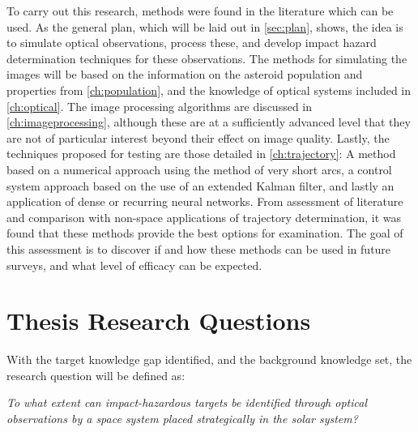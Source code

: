 To carry out this research, methods were found in the literature which can be used. As the general plan, which will be laid out in \autoref{sec:plan}, shows, the idea is to simulate optical observations, process these, and develop impact hazard determination techniques for these observations. The methods for simulating the images will be based on the information on the asteroid population and properties from \autoref{ch:population}, and the knowledge of optical systems included in \autoref{ch:optical}. The image processing algorithms are discussed in \autoref{ch:imageprocessing}, although these are at a sufficiently advanced level that they are not of particular interest beyond their effect on image quality. Lastly, the techniques proposed for testing are those detailed in \autoref{ch:trajectory}: A method based on a numerical approach using the method of very short arcs, a control system approach based on the use of an extended Kalman filter, and lastly an application of dense or recurring neural networks. From assessment of literature and comparison with non-space applications of trajectory determination, it was found that these methods provide the best options for examination. The goal of this assessment is to discover if and how these methods can be used in future surveys, and what level of efficacy can be expected. 


\section{Thesis Research Questions}
With the target knowledge gap identified, and the background knowledge set, the research question will be defined as: \\

\begin{changemargin}{1cm}{1cm}
\begin{center}
\textit{\large{To what extent can impact-hazardous targets be identified through optical observations by a space system placed strategically in the solar system?}}
\end{center}
\end{changemargin}
\vspace{0.5cm}

